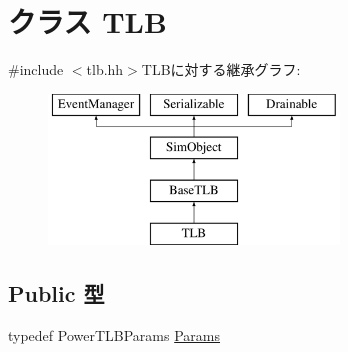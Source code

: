\hypertarget{classPowerISA_1_1TLB}{
\section{クラス TLB}
\label{classPowerISA_1_1TLB}
}


{\ttfamily \#include $<$tlb.hh$>$}TLBに対する継承グラフ:\begin{figure}[H]
\begin{center}
\leavevmode
\includegraphics[height=4cm]{classPowerISA_1_1TLB}
\end{center}
\end{figure}
\subsection*{Public 型}
\begin{DoxyCompactItemize}
\item 
typedef PowerTLBParams \hyperlink{classPowerISA_1_1TLB_a483872f6d75119b1124c758297acc6da}{Params}
\end{DoxyCompactItemize}
